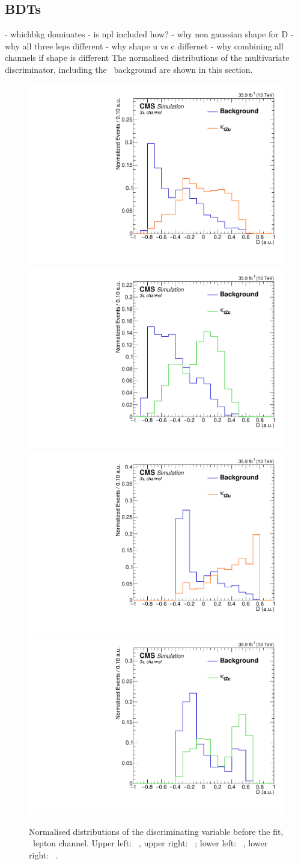 \subsection{BDTs}
\label{sec:BDTs}
- whichbkg dominates
- is npl included how? 
- why non gaussian shape for D
- why all three leps different 
- why shape u vs c differnet
- why combining all channels if shape is different
The normalised distributions of the multivariate discriminator, including the \NPL\ background are shown in this section. 
\begin{figure}[htbp]
	\centering
	\includegraphics[width=0.49\linewidth]{6_Search/Figures/BDTdistributionsNorm/toppair_Zut_BDT_uuu_Normalized}
	\includegraphics[width=0.49\linewidth]{6_Search/Figures/BDTdistributionsNorm/toppair_Zct_BDT_uuu_Normalized}
	\includegraphics[width=0.49\linewidth]{6_Search/Figures/BDTdistributionsNorm/singletop_Zut_BDT_uuu_Normalized}
	\includegraphics[width=0.49\linewidth]{6_Search/Figures/BDTdistributionsNorm/singletop_Zct_BDT_uuu_Normalized}
	\caption{Normalised distributions of the discriminating variable before the fit, \mumumu\ lepton channel. Upper left: \TTSR\ \Zut , upper right: \TTSR\ \Zct ; lower left: \STSR\  \Zut , lower right: \STSR\  \Zct .}
	\label{fig:bdtuuunorm}
\end{figure}	


